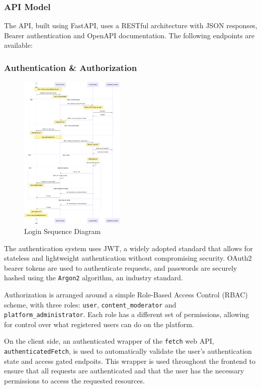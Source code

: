 \documentclass[11pt,italian,a4paper]{article}
\begin{document}
\subsubsection{API Model}

The API, built using FastAPI, uses a RESTful architecture with JSON responses, Bearer authentication and OpenAPI documentation. The following endpoints are available:



\subsubsection{Authentication \& Authorization}
\label{sec:auth}

\begin{figure}
    \centering
    \includegraphics[width=0.45\textwidth]{figures/login_sequence.png}
    \caption{Login Sequence Diagram}
\end{figure}

The authentication system uses JWT, a widely adopted standard that allows for stateless and lightweight authentication without compromising security. OAuth2 bearer tokens are used to authenticate requests, and passwords are securely hashed using the \texttt{Argon2} algorithm, an industry standard.

Authorization is arranged around a simple Role-Based Access Control (RBAC) scheme, with three roles: \texttt{user}, \texttt{content\_moderator} and \texttt{platform\_administrator}. Each role has a different set of permissions, allowing for control over what registered users can do on the platform.

On the client side, an authenticated wrapper of the \texttt{fetch} web API, \texttt{authenticatedFetch}, is used to automatically validate the user's authentication state and access gated endpoits. This wrapper is used throughout the frontend to ensure that all requests are authenticated and that the user has the necessary permissions to access the requested resources.
\end{document}
